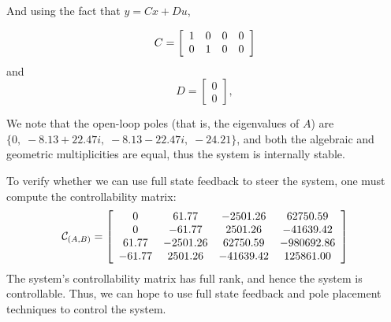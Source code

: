 And using the fact that \(y = Cx + Du\),

\[
    C =
    \left[\begin{array}{c c c c}
            1 & 0 & 0 & 0 \\
            0 & 1 & 0 & 0
        \end{array}\right]
\]
and
\[
    D =
    \left[\begin{array}{c}
            0 \\
            0
        \end{array}\right],
\]

We note that the open-loop poles (that is, the eigenvalues of \(A\)) are $\{0,\; -8.13+22.47i,\; -8.13-22.47i,\; -24.21\}$, and both the algebraic and geometric multiplicities are equal, thus the system is internally stable.

To verify whether we can use full state feedback to steer the system, one must compute the controllability matrix:
\[
    \mathcal{C}_{(A,B)} = \left[\begin{array}{c c c c}
            0      & 61.77    & -2501.26  & 62750.59   \\
            0      & -61.77   & 2501.26   & -41639.42  \\
            61.77  & -2501.26 & 62750.59  & -980692.86 \\
            -61.77 & 2501.26  & -41639.42 & 125861.00
        \end{array}\right]
\]
The system's controllability matrix has full rank, and hence the system is controllable. Thus, we can hope to use full state feedback and pole placement techniques to control the system.

